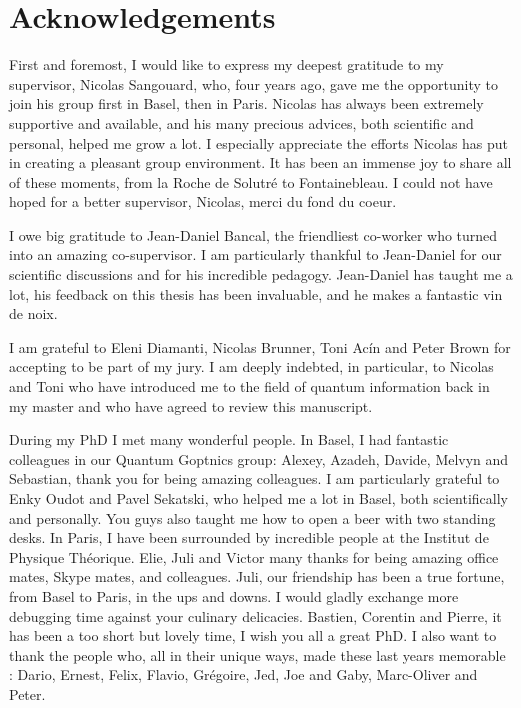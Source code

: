 \chapter{Acknowledgements}

First and foremost, I would like to express my deepest gratitude to my supervisor, Nicolas Sangouard, who, four years ago, gave me the opportunity to join his group first in Basel, then in Paris.
Nicolas has always been extremely supportive and available, and his many precious advices, both scientific and personal, helped me grow a lot.
I especially appreciate the efforts Nicolas has put in creating a pleasant group environment.
It has been an immense joy to share all of these moments, from la Roche de Solutré to Fontainebleau.
I could not have hoped for a better supervisor, Nicolas, merci du fond du coeur.

\medbreak

I owe big gratitude to Jean-Daniel Bancal, the friendliest co-worker who turned into an amazing co-supervisor. 
I am particularly thankful to Jean-Daniel for our scientific discussions and for his incredible pedagogy.
Jean-Daniel has taught me a lot, his feedback on this thesis has been invaluable, and he makes a fantastic vin de noix.


\medbreak

I am grateful to Eleni Diamanti, Nicolas Brunner, Toni Acín and Peter Brown for accepting to be part of my jury.
I am deeply indebted, in particular, to Nicolas and Toni who have introduced me to the field of quantum information back in my master and who have agreed to review this manuscript.

\medbreak

During my PhD I met many wonderful people. 
In Basel, I had fantastic colleagues in our Quantum Goptnics group: Alexey, Azadeh, Davide, Melvyn and Sebastian, thank you for being amazing colleagues.
I am particularly grateful to Enky Oudot and Pavel Sekatski, who helped me a lot in Basel, both scientifically and personally. 
You guys also taught me how to open a beer with two standing desks.
In Paris, I have been surrounded by incredible people at the Institut de Physique Théorique.
Elie, Juli and Victor many thanks for being amazing office mates, Skype mates, and colleagues.
Juli, our friendship has been a true fortune, from Basel to Paris, in the ups and downs. 
I would gladly exchange more debugging time against your culinary delicacies.
Bastien, Corentin and Pierre, it has been a too short but lovely time, I wish you all a great PhD.
I also want to thank the people who, all in their unique ways, made these last years memorable : Dario, Ernest, Felix, Flavio, Grégoire, Jed, Joe and Gaby, Marc-Oliver and Peter.


